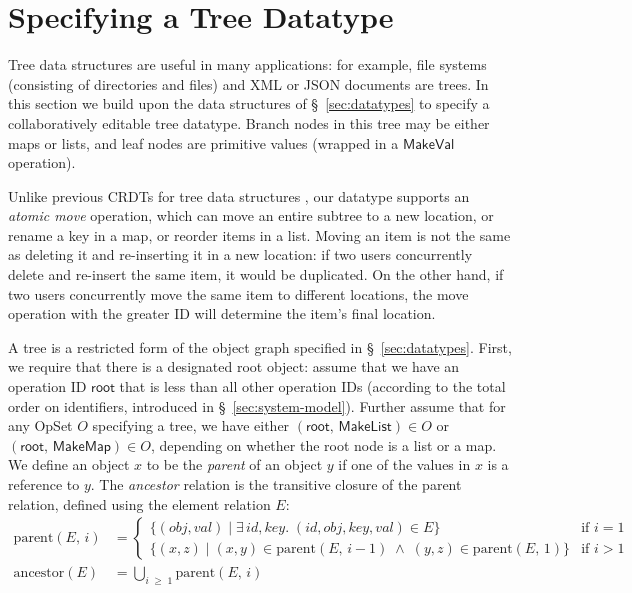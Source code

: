 \section{Specifying a Tree Datatype}\label{sec:tree}

Tree data structures are useful in many applications: for example, file systems (consisting of directories and files) and XML or JSON documents are trees.
In this section we build upon the data structures of \S~\ref{sec:datatypes} to specify a collaboratively editable tree datatype.
Branch nodes in this tree may be either maps or lists, and leaf nodes are primitive values (wrapped in a $\mathsf{MakeVal}$ operation).

Unlike previous CRDTs for tree data structures \cite{Martin:2010ih,Kleppmann:2016ve}, our datatype supports an \emph{atomic move} operation, which can move an entire subtree to a new location, or rename a key in a map, or reorder items in a list.
Moving an item is not the same as deleting it and re-inserting it in a new location: if two users concurrently delete and re-insert the same item, it would be duplicated.
On the other hand, if two users concurrently move the same item to different locations, the move operation with the greater ID will determine the item's final location.

A tree is a restricted form of the object graph specified in \S~\ref{sec:datatypes}.
First, we require that there is a designated root object: assume that we have an operation ID $\mathsf{root}$ that is less than all other operation IDs (according to the total order on identifiers, introduced in \S~\ref{sec:system-model}).
Further assume that for any OpSet $O$ specifying a tree, we have either $(\mathsf{root},\, \mathsf{MakeList}) \in O$ or $(\mathsf{root},\, \mathsf{MakeMap}) \in O$, depending on whether the root node is a list or a map.
We define an object $x$ to be the \emph{parent} of an object $y$ if one of the values in $x$ is a reference to $y$.
The \emph{ancestor} relation is the transitive closure of the parent relation, defined using the element relation $E$:
\begin{align*}
    \mathrm{parent}(E,\, i) &=
    \begin{cases}
        \big\{ (\mathit{obj}, \mathit{val}) \mid \exists\,\mathit{id}, \mathit{key}.\;
            (\mathit{id}, \mathit{obj}, \mathit{key}, \mathit{val}) \in E \big\} & \text{if } i=1 \\
        \big\{ (x, z) \mid (x, y) \in \mathrm{parent}(E,\, i-1) \;\wedge\;
            (y, z) \in \mathrm{parent}(E,\, 1) \big\} & \text{if } i > 1
    \end{cases} \\[8pt]
    \mathrm{ancestor}(E) &= \bigcup_{i \;\geq\; 1} \mathrm{parent}(E,\, i)
\end{align*}


